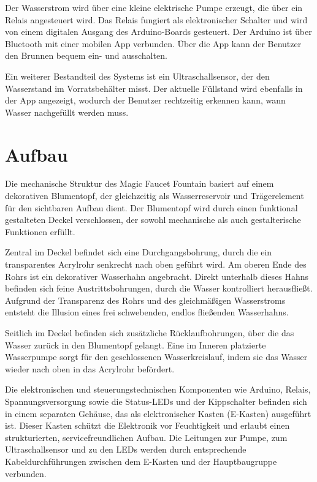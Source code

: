 Der Wasserstrom wird über eine kleine elektrische Pumpe erzeugt, die über ein Relais angesteuert wird. Das Relais fungiert als elektronischer Schalter und wird von einem digitalen Ausgang des Arduino-Boards gesteuert. Der Arduino ist über Bluetooth mit einer mobilen App verbunden. Über die App kann der Benutzer den Brunnen bequem ein- und ausschalten.

Ein weiterer Bestandteil des Systems ist ein Ultraschallsensor, der den Wasserstand im Vorratsbehälter misst. Der aktuelle Füllstand wird ebenfalls in der App angezeigt, wodurch der Benutzer rechtzeitig erkennen kann, wann Wasser nachgefüllt werden muss.


\section{Aufbau}
Die mechanische Struktur des Magic Faucet Fountain basiert auf einem dekorativen Blumentopf, der gleichzeitig als Wasserreservoir und Trägerelement für den sichtbaren Aufbau dient. Der Blumentopf wird durch einen funktional gestalteten Deckel verschlossen, der sowohl mechanische als auch gestalterische Funktionen erfüllt.

Zentral im Deckel befindet sich eine Durchgangsbohrung, durch die ein transparentes Acrylrohr senkrecht nach oben geführt wird. Am oberen Ende des Rohrs ist ein dekorativer Wasserhahn angebracht. Direkt unterhalb dieses Hahns befinden sich feine Austrittsbohrungen, durch die Wasser kontrolliert herausfließt. Aufgrund der Transparenz des Rohrs und des gleichmäßigen Wasserstroms entsteht die Illusion eines frei schwebenden, endlos fließenden Wasserhahns.

Seitlich im Deckel befinden sich zusätzliche Rücklaufbohrungen, über die das Wasser zurück in den Blumentopf gelangt. Eine im Inneren platzierte Wasserpumpe sorgt für den geschlossenen Wasserkreislauf, indem sie das Wasser wieder nach oben in das Acrylrohr befördert.

Die elektronischen und steuerungstechnischen Komponenten wie Arduino, Relais, Spannungsversorgung sowie die Status-LEDs und der Kippschalter befinden sich in einem separaten Gehäuse, das als elektronischer Kasten (E-Kasten) ausgeführt ist. Dieser Kasten schützt die Elektronik vor Feuchtigkeit und erlaubt einen strukturierten, servicefreundlichen Aufbau. Die Leitungen zur Pumpe, zum Ultraschallsensor und zu den LEDs werden durch entsprechende Kabeldurchführungen zwischen dem E-Kasten und der Hauptbaugruppe verbunden.

